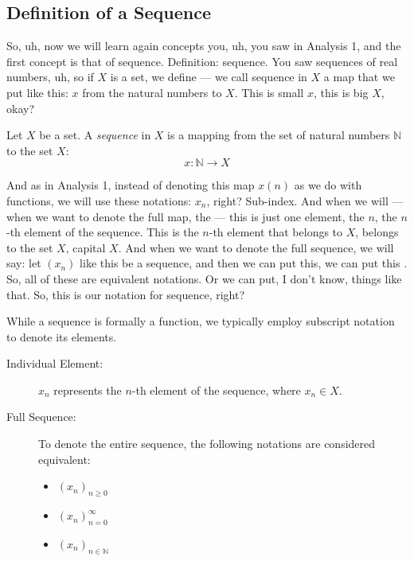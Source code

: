 \subsection*{Definition of a Sequence}

\begin{spoken-clean}[00:00:50 - 00:01:50]
So, uh, now we will learn again concepts you, uh, you saw in Analysis 1, and the first concept is that of sequence.  Definition: sequence. You saw sequences of real numbers, uh, so if $X$ is a set, we define — we call sequence in $X$ a map that we put like this: $x$ from the natural numbers to $X$. This is small $x$, this is big $X$, okay?
\end{spoken-clean}

\begin{math-stroke}
\setcounter{theorem}{14}
\begin{definition}\label{def:sequence}
Let $X$ be a set. A \emph{sequence} in $X$ is a mapping from the set of natural numbers $\mathbb{N}$ to the set $X$:
\[ x: \mathbb{N} \to X \]
\end{definition}
\end{math-stroke}

\begin{spoken-clean}[00:01:50 - 00:03:00]
And as in Analysis 1, instead of denoting this map $x(n)$ as we do with functions, we will use these notations: $x_n$, right? Sub-index. And when we will — when we want to denote the full map, the — this is just one element, the $n$, the $n$-th element of the sequence. This is the $n$-th element that belongs to $X$, belongs to the set $X$, capital $X$. And when we want to denote the full sequence, we will say: let $(x_n)$ like this be a sequence, and then we can put this, we can put this . So, all of these are equivalent notations. Or we can put, I don't know, things like that. So, this is our notation for sequence, right?
\end{spoken-clean}

\begin{math-stroke}
While a sequence is formally a function, we typically employ subscript notation to denote its elements.
\begin{description}
    \item[Individual Element:] $x_n$ represents the $n$-th element of the sequence, where $x_n \in X$.
    \item[Full Sequence:] To denote the entire sequence, the following notations are considered equivalent:
    \begin{itemize}
        \item $(x_n)_{n \ge 0}$
        \item $(x_n)_{n=0}^{\infty}$
        \item $(x_n)_{n \in \mathbb{N}}$
    \end{itemize}
\end{description}
\end{math-stroke}

